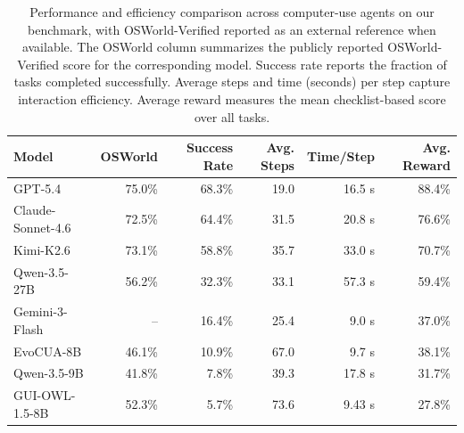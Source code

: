 \begin{table}[t]
\centering
\small
\setlength{\tabcolsep}{5pt}
\renewcommand{\arraystretch}{1.12}
\caption{Performance and efficiency comparison across computer-use agents on our benchmark, with OSWorld-Verified reported as an external reference when available. The OSWorld column summarizes the publicly reported OSWorld-Verified score for the corresponding model. Success rate reports the fraction of tasks completed successfully. Average steps and time (seconds) per step capture interaction efficiency. Average reward measures the mean checklist-based score over all tasks.}
\vspace{-0.5em}
\begin{tabular}{l|r|rrrr}
\toprule
\textbf{Model} 
& \textbf{OSWorld} 
& \textbf{Success Rate} 
& \textbf{Avg. Steps} 
& \textbf{Time/Step} 
& \textbf{Avg. Reward} \\
\midrule
GPT-5.4           & 75.0\% & 68.3\% & 19.0 & 16.5 s  & 88.4\% \\
Claude-Sonnet-4.6 & 72.5\% & 64.4\% & 31.5 & 20.8 s  & 76.6\% \\
Kimi-K2.6         & 73.1\% & 58.8\% & 35.7 & 33.0 s  & 70.7\% \\
Qwen-3.5-27B      & 56.2\% & 32.3\% & 33.1 & 57.3 s  & 59.4\% \\
Gemini-3-Flash    & --     & 16.4\% & 25.4 & 9.0 s   & 37.0\% \\
EvoCUA-8B         & 46.1\% & 10.9\% & 67.0 & 9.7 s   & 38.1\% \\
Qwen-3.5-9B       & 41.8\% & 7.8\%  & 39.3 & 17.8 s  & 31.7\% \\
GUI-OWL-1.5-8B    & 52.3\% & 5.7\%  & 73.6 & 9.43 s  & 27.8\% \\
\bottomrule
\end{tabular}
\label{tab:model_results}
\end{table}